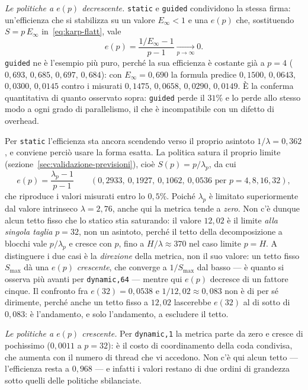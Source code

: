 \medskip
\noindent\emph{Le politiche a $e(p)$ decrescente.}
\texttt{static} e \texttt{guided} condividono la stessa firma: un'efficienza che
si stabilizza su un valore $E_\infty < 1$ e una $e(p)$ che, sostituendo
$S = p\,E_\infty$ in~\eqref{eq:karp-flatt}, vale
\[
    e(p) = \frac{1/E_\infty - 1}{p - 1} \xrightarrow[p \to \infty]{} 0 .
\]
\texttt{guided} ne è l'esempio più puro, perché la sua efficienza è costante già
a $p = 4$ ($0{,}693$, $0{,}685$, $0{,}697$, $0{,}684$): con
$E_\infty = 0{,}690$ la formula predice $0{,}1500$, $0{,}0643$, $0{,}0300$,
$0{,}0145$ contro i misurati $0{,}1475$, $0{,}0658$, $0{,}0290$, $0{,}0149$. È
la conferma quantitativa di quanto osservato sopra: \texttt{guided} perde il
$31\%$ e lo perde allo stesso modo a ogni grado di parallelismo, il che è
incompatibile con un difetto di overhead.

Per \texttt{static} l'efficienza sta ancora scendendo verso il proprio asintoto
$1/\lambda = 0{,}362$, e conviene perciò usare la forma esatta. La politica
satura il proprio limite (sezione~\ref{sec:validazione-previsioni}), cioè
$S(p) = p/\lambda_p$, da cui
\[
    e(p) = \frac{\lambda_p - 1}{p - 1}
    \qquad
    (0{,}2933,\ 0{,}1927,\ 0{,}1062,\ 0{,}0536 \text{ per } p = 4, 8, 16, 32),
\]
che riproduce i valori misurati entro lo $0{,}5\%$. Poiché $\lambda_p$ è limitato
superiormente dal valore intrinseco $\lambda = 2{,}76$, anche qui la metrica
tende a \emph{zero}. Non c'è dunque alcun tetto fisso che lo statico stia
saturando: il valore $12{,}02$ è il limite \emph{alla singola taglia} $p = 32$,
non un asintoto, perché il tetto della decomposizione a blocchi vale
$p/\lambda_p$ e cresce con $p$, fino a $H/\lambda \approx 370$ nel caso limite
$p = H$. A distinguere i due casi è la \emph{direzione} della metrica, non il suo
valore: un tetto fisso $S_{\max}$ dà una $e(p)$ \emph{crescente}, che converge a
$1/S_{\max}$ dal basso --- è quanto si osserva più avanti per \texttt{dynamic,64}
--- mentre qui $e(p)$ decresce di un fattore cinque. Il confronto fra
$e(32) = 0{,}0538$ e $1/12{,}02 \approx 0{,}083$ non è di per sé dirimente,
perché anche un tetto fisso a $12{,}02$ lascerebbe $e(32)$ al di sotto di
$0{,}083$: è l'andamento, e solo l'andamento, a escludere il tetto.

\medskip
\noindent\emph{Le politiche a $e(p)$ crescente.}
Per \texttt{dynamic,1} la metrica parte da zero e cresce di pochissimo
($0{,}0011$ a $p = 32$): è il costo di coordinamento della coda condivisa, che
aumenta con il numero di thread che vi accedono. Non c'è qui alcun tetto ---
l'efficienza resta a $0{,}968$ --- e infatti i valori restano di due ordini di
grandezza sotto quelli delle politiche sbilanciate.

